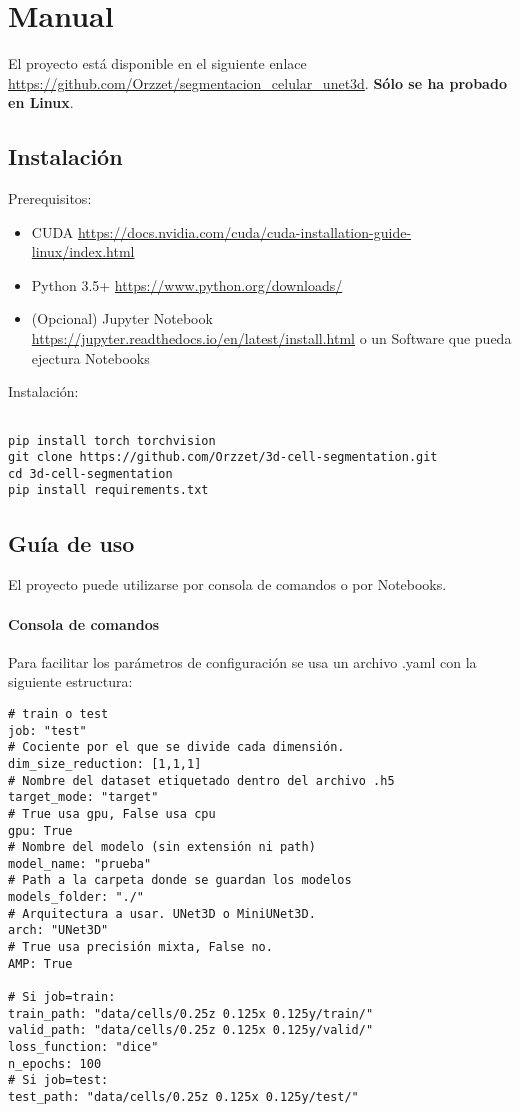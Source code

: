 \chapter{Manual}\label{manual}

El proyecto está disponible en el siguiente enlace \url{https://github.com/Orzzet/segmentacion_celular_unet3d}. \textbf{Sólo se ha probado en Linux}.

\section{Instalación}

Prerequisitos:

\begin{itemize}
\item CUDA \url{https://docs.nvidia.com/cuda/cuda-installation-guide-linux/index.html}
\item Python 3.5+ \url{https://www.python.org/downloads/}
\item (Opcional) Jupyter Notebook \url{https://jupyter.readthedocs.io/en/latest/install.html} o un Software que pueda ejectura Notebooks
\end{itemize}


Instalación:

\begin{verbatim}

pip install torch torchvision
git clone https://github.com/Orzzet/3d-cell-segmentation.git
cd 3d-cell-segmentation
pip install requirements.txt

\end{verbatim}

\section{Guía de uso}
El proyecto puede utilizarse por consola de comandos o por Notebooks.

\subsubsection{Consola de comandos}

Para facilitar los parámetros de configuración se usa un archivo .yaml con la siguiente estructura:
\begin{verbatim}
# train o test
job: "test" 
# Cociente por el que se divide cada dimensión.
dim_size_reduction: [1,1,1]
# Nombre del dataset etiquetado dentro del archivo .h5
target_mode: "target" 
# True usa gpu, False usa cpu
gpu: True
# Nombre del modelo (sin extensión ni path)
model_name: "prueba"
# Path a la carpeta donde se guardan los modelos 
models_folder: "./"
# Arquitectura a usar. UNet3D o MiniUNet3D. 
arch: "UNet3D"
# True usa precisión mixta, False no. 
AMP: True

# Si job=train:
train_path: "data/cells/0.25z 0.125x 0.125y/train/"
valid_path: "data/cells/0.25z 0.125x 0.125y/valid/"
loss_function: "dice"
n_epochs: 100
# Si job=test:
test_path: "data/cells/0.25z 0.125x 0.125y/test/"

\end{verbatim}

